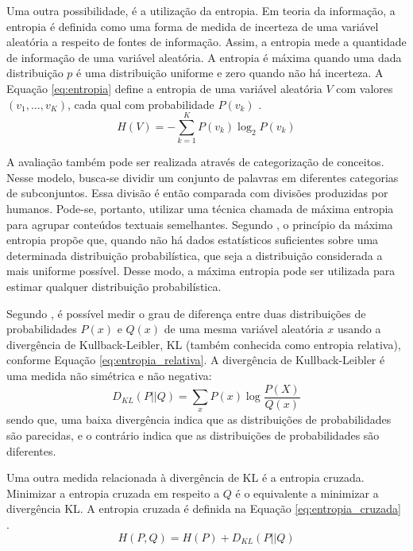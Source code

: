 Uma outra possibilidade, é a utilização da entropia. Em teoria da informação, a entropia é definida como uma forma de medida de incerteza de uma variável aleatória a respeito de fontes de informação. Assim, a entropia mede a quantidade de informação de uma variável aleatória. A entropia é máxima quando uma dada distribuição $p$ é uma distribuição uniforme e zero quando não há incerteza. A Equação \ref{eq:entropia} define a entropia de uma variável aleatória $V$ com valores $(v_1, \dots, v_K)$, cada qual com probabilidade $P(v_k)$ \cite{Russell2009Artificial}. 
\begin{equation} \label{eq:entropia}
    H(V) = - \sum_{k=1}^{K} P(v_k) \log_2 P(v_k)
\end{equation}

A avaliação também pode ser realizada através de categorização de conceitos. Nesse modelo, busca-se dividir um conjunto de palavras em diferentes categorias de subconjuntos. Essa divisão é então comparada com divisões produzidas por humanos. Pode-se, portanto, utilizar uma técnica chamada de máxima entropia para agrupar conteúdos textuais semelhantes. Segundo \textcite{Nigam99UsingMaximum}, o princípio da máxima entropia propõe que, quando não há dados estatísticos suficientes sobre uma determinada distribuição probabilística, que seja a distribuição considerada a mais uniforme possível. Desse modo, a máxima entropia pode ser utilizada para estimar qualquer distribuição probabilística.

Segundo \textcite{Goodfellow2016DeepLearning}, é possível medir o grau de diferença entre duas distribuições de probabilidades $P(x)$ e $Q(x)$ de uma mesma variável aleatória $x$ usando a divergência de Kullback-Leibler, KL (também conhecida como entropia relativa), conforme Equação \ref{eq:entropia_relativa}. A divergência de Kullback-Leibler é uma medida não simétrica e não negativa:
\begin{equation}
    \label{eq:entropia_relativa}
    D_{KL}(P||Q) = \sum_{x} P(x) \log \frac{P(X)}{Q(x)}
\end{equation}
sendo que, uma baixa divergência indica que as distribuições de probabilidades são parecidas, e o contrário indica que as distribuições de probabilidades são diferentes.

Uma outra medida relacionada à divergência de KL é a entropia cruzada. Minimizar a entropia cruzada em respeito a $Q$ é o equivalente a minimizar a divergência KL. A entropia cruzada é definida na Equação \ref{eq:entropia_cruzada} \cite{Goodfellow2016DeepLearning}.
\begin{equation}
    \label{eq:entropia_cruzada}
    H(P, Q) = H(P) + D_{KL}(P||Q)
\end{equation}

